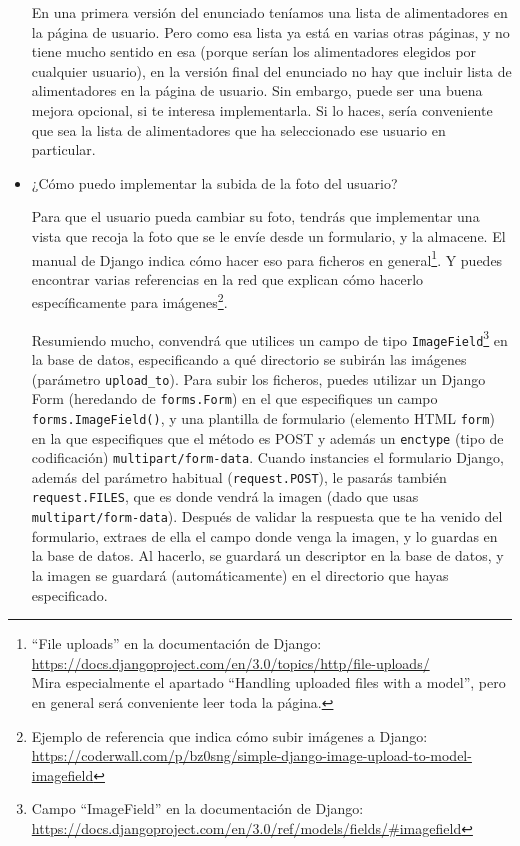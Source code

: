 \begin{itemize}
  En una primera versión del enunciado teníamos una lista de alimentadores en la página de usuario. Pero como esa lista ya está en varias otras páginas, y no tiene mucho sentido en esa (porque serían los alimentadores elegidos por cualquier usuario), en la versión final del enunciado no hay que incluir lista de alimentadores en la página de usuario. Sin embargo, puede ser una buena mejora opcional, si te interesa implementarla. Si lo haces, sería conveniente que sea la lista de alimentadores que ha seleccionado ese usuario en particular.

\item ¿Cómo puedo implementar la subida de la foto del usuario?

  Para que el usuario pueda cambiar su foto, tendrás que implementar una vista que recoja la foto que se le envíe desde un formulario, y la almacene. El manual de Django indica cómo hacer eso para ficheros en general\footnote{``File uploads'' en la documentación de Django: \\ \url{https://docs.djangoproject.com/en/3.0/topics/http/file-uploads/} \\
    Mira especialmente el apartado ``Handling uploaded files with a model'', pero en general será conveniente leer toda la página.}. Y puedes encontrar varias referencias en la red que explican cómo hacerlo específicamente para imágenes\footnote{Ejemplo de referencia que indica cómo subir imágenes a Django: \\
    \url{https://coderwall.com/p/bz0sng/simple-django-image-upload-to-model-imagefield}}.

  Resumiendo mucho, convendrá que utilices un campo de tipo \verb|ImageField|\footnote{Campo ``ImageField'' en la documentación de Django: \\ \url{https://docs.djangoproject.com/en/3.0/ref/models/fields/\#imagefield}} en la base de datos, especificando a qué directorio se subirán las imágenes (parámetro \verb|upload_to|). Para subir los ficheros, puedes utilizar un Django Form (heredando de \verb|forms.Form|) en el que especifiques un campo \verb|forms.ImageField()|, y una plantilla de formulario (elemento HTML \verb|form|) en la que especifiques que el método es POST y además un \verb|enctype| (tipo de codificación) \verb|multipart/form-data|. Cuando instancies el formulario Django, además del parámetro habitual (\verb|request.POST|), le pasarás también \verb|request.FILES|, que es donde vendrá la imagen (dado que usas \verb|multipart/form-data|). Después de validar la respuesta que te ha venido del formulario, extraes de ella el campo donde venga la imagen, y lo guardas en la base de datos. Al hacerlo, se guardará un descriptor en la base de datos, y la imagen se guardará (automáticamente) en el directorio que hayas especificado.


\end{itemize}
